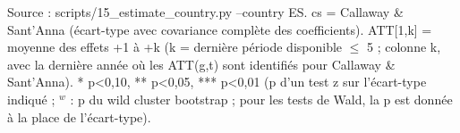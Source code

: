 \begin{table}
\begin{threeparttable}
\begin{tablenotes}
\item Source : scripts/15\_estimate\_country.py --country ES. cs = Callaway \& Sant'Anna (écart-type avec covariance complète des coefficients). ATT[1,k] = moyenne des effets +1 à +k (k = dernière période disponible $\leq$ 5 ; colonne k, avec la dernière année où les ATT(g,t) sont identifiés pour Callaway \& Sant'Anna). * p<0,10, ** p<0,05, *** p<0,01 (p d'un test z sur l'écart-type indiqué ; $^{w}$ : p du wild cluster bootstrap ; pour les tests de Wald, la p est donnée à la place de l'écart-type).
\end{tablenotes}
\end{threeparttable}
\end{table}
